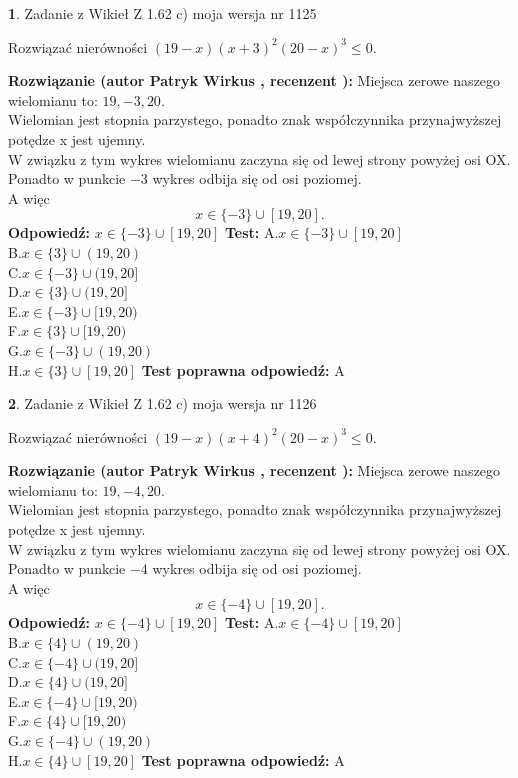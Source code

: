 \documentclass[12pt, a4paper]{article}
\theoremstyle{definition} %
\newtheorem{zad}{}
\newcommand{\zadStart}[1]{\begin{zad}#1\newline}
\newcommand{\zadStop}{\end{zad}}
\newcommand{\rozwStart}[2]{\noindent \textbf{Rozwiązanie (autor #1 , recenzent #2): }\newline}
\newcommand{\rozwStop}{\newline}
\newcommand{\odpStart}{\noindent \textbf{Odpowiedź:}\newline}
\newcommand{\odpStop}{\newline}
\newcommand{\testStart}{\noindent \textbf{Test:}\newline}
\newcommand{\testStop}{\newline}
\newcommand{\kluczStart}{\noindent \textbf{Test poprawna odpowiedź:}\newline}
\newcommand{\kluczStop}{\newline}
\begin{document}
\zadStart{Zadanie z Wikieł Z 1.62 c) moja wersja nr 1125}

Rozwiązać nierówności $(19-x)(x+3)^{2}(20-x)^{3}\le0$.
\zadStop
\rozwStart{Patryk Wirkus}{}
Miejsca zerowe naszego wielomianu to: $19, -3, 20$.\\
Wielomian jest stopnia parzystego, ponadto znak współczynnika przy\linebreak najwyższej potędze x jest ujemny.\\ W związku z tym wykres wielomianu zaczyna się od lewej strony powyżej osi OX.\\
Ponadto w punkcie $-3$ wykres odbija się od osi poziomej.\\
A więc $$x \in \{-3\} \cup [19,20].$$
\rozwStop
\odpStart
$x \in \{-3\} \cup [19,20]$
\odpStop
\testStart
A.$x \in \{-3\} \cup [19,20]$\\
B.$x \in \{3\} \cup (19,20)$\\
C.$x \in \{-3\} \cup (19,20]$\\
D.$x \in \{3\} \cup (19,20]$\\
E.$x \in \{-3\} \cup [19,20)$\\
F.$x \in \{3\} \cup [19,20)$\\
G.$x \in \{-3\} \cup (19,20)$\\
H.$x \in \{3\} \cup [19,20]$
\testStop
\kluczStart
A
\kluczStop



\zadStart{Zadanie z Wikieł Z 1.62 c) moja wersja nr 1126}

Rozwiązać nierówności $(19-x)(x+4)^{2}(20-x)^{3}\le0$.
\zadStop
\rozwStart{Patryk Wirkus}{}
Miejsca zerowe naszego wielomianu to: $19, -4, 20$.\\
Wielomian jest stopnia parzystego, ponadto znak współczynnika przy\linebreak najwyższej potędze x jest ujemny.\\ W związku z tym wykres wielomianu zaczyna się od lewej strony powyżej osi OX.\\
Ponadto w punkcie $-4$ wykres odbija się od osi poziomej.\\
A więc $$x \in \{-4\} \cup [19,20].$$
\rozwStop
\odpStart
$x \in \{-4\} \cup [19,20]$
\odpStop
\testStart
A.$x \in \{-4\} \cup [19,20]$\\
B.$x \in \{4\} \cup (19,20)$\\
C.$x \in \{-4\} \cup (19,20]$\\
D.$x \in \{4\} \cup (19,20]$\\
E.$x \in \{-4\} \cup [19,20)$\\
F.$x \in \{4\} \cup [19,20)$\\
G.$x \in \{-4\} \cup (19,20)$\\
H.$x \in \{4\} \cup [19,20]$
\testStop
\kluczStart
A
\kluczStop
\end{document}
